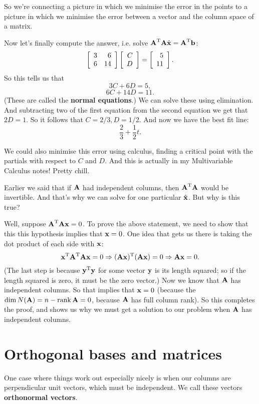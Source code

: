 
So we're connecting a picture in which we minimise the error in the points to a picture in which we minimise the error between a vector and the column space of a matrix. 

Now let's finally compute the answer, i.e. solve $\boldsymbol{\mathbf{A}}^\mathrm{T}\boldsymbol{\mathbf{A}}\hat{\boldsymbol{\mathbf{x}}}=\boldsymbol{\mathbf{A}}^\mathrm{T}\boldsymbol{\mathbf{b}}$:
\[ \left[ \begin{array}{rrrrrrrrrrrrrrrrrrrrrrrrr} 3&6\\6&14\\ \end{array} \right]\left[ \begin{array}{rrrrrrrrrrrrrrrrrrrrrrrrr} C\\D\\ \end{array} \right] = \left[ \begin{array}{rrrrrrrrrrrrrrrrrrrrrrrrr} 5\\11\\ \end{array} \right]. \]
So this tells us that
\[ 3C + 6D = 5, \]
\[ 6C + 14D = 11. \]
(These are called the \textbf{normal equations}.) We can solve these using elimination. And subtracting two of the first equation from the second equation we get that $2D = 1$. So it follows that $C = 2/3, D = 1/2$. And now we have the best fit line:
\[ \frac 23 + \frac 12t. \]

\brm
We could also minimise this error using calculus, finding a critical point with the partials with respect to $C$ and $D$. And this is actually in my Multivariable Calculus notes! Pretty chill.
\erm

Earlier we said that if $\boldsymbol{\mathbf{A}}$ had independent columns, then $\boldsymbol{\mathbf{A}}^\mathrm{T}\boldsymbol{\mathbf{A}}$ would be invertible. And that's why we can solve for one particular $\hat{\boldsymbol{\mathbf{x}}}$. But why is this true?

Well, suppose $\boldsymbol{\mathbf{A}}^\mathrm{T}\boldsymbol{\mathbf{A}}\boldsymbol{\mathbf{x}} = 0$. To prove the above statement, we need to show that this this hypothesis implies that $\boldsymbol{\mathbf{x}} = 0$. One idea that gets us there is taking the dot product of each side with $\boldsymbol{\mathbf{x}}$:
\[ \boldsymbol{\mathbf{x}}^\mathrm{T} \boldsymbol{\mathbf{A}}^\mathrm{T}\boldsymbol{\mathbf{A}}\boldsymbol{\mathbf{x}} = 0 \Rightarrow (\boldsymbol{\mathbf{A}}\boldsymbol{\mathbf{x}})^\mathrm{T}(\boldsymbol{\mathbf{A}}\boldsymbol{\mathbf{x}}) = 0 \Rightarrow \boldsymbol{\mathbf{A}}\boldsymbol{\mathbf{x}} = 0. \]
(The last step is because $\boldsymbol{\mathbf{y}}^\mathrm{T}\boldsymbol{\mathbf{y}}$ for some vector $\boldsymbol{\mathbf{y}}$ is its length squared; so if the length squared is zero, it must be the zero vector.) Now we know that $\boldsymbol{\mathbf{A}}$ has independent columns. So that implies that $\boldsymbol{\mathbf{x}} = 0$ (because the $\mathrm{dim}\, N(\boldsymbol{\mathbf{A}}) = n - \mathrm{rank}\, \boldsymbol{\mathbf{A}} = 0$, because $\boldsymbol{\mathbf{A}}$ has full column rank). So this completes the proof, and shows us why we must get a solution to our problem when $\boldsymbol{\mathbf{A}}$ has independent columns.

\section{Orthogonal bases and matrices}

One case where things work out especially nicely is when our columns are perpendicular unit vectors, which must be independent. We call these vectors \textbf{orthonormal vectors}. 